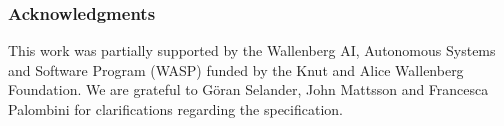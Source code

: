 \documentclass[runningheads, envcountsame, a4paper, draft, x11names]{llncs}
\newcommand{\spacehack}{\vspace{-1em}}
\begin{document}
\spacehack
\subsubsection*{Acknowledgments} This work was partially supported by
the Wallenberg AI, Autonomous Systems and Software Program (WASP) funded by
the Knut and Alice Wallenberg Foundation.
%
We are grateful to G\"oran Selander, John Mattsson and Francesca Palombini for
clarifications regarding the specification.
%


\spacehack
%


\end{document}
